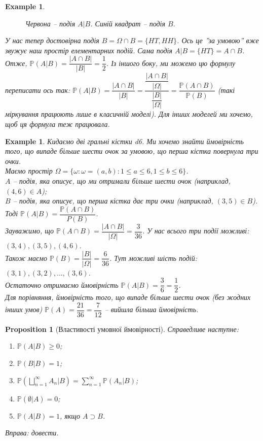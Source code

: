 \documentclass[a4paper, 10pt]{article}
\theoremstyle{theoremdd}
\newtheorem{example}[theorem]{Example}
\newtheorem{proposition}[theorem]{Proposition}
\begin{document}
\begin{example}
\begin{figure}[H]
\caption*{Червона -- подія $A|B$. Синій квадрат -- подія $B$.}
\end{figure}
\noindent
У нас тепер достовірна подія $B = \Omega \cap B = \{HT,HH\}$. Ось це ''за умовою'' вже звужує наш простір елементарних подій. Сама подія $A|B = \{HT\} = A \cap B$. Отже, $\mathbb{P}(A|B) = \dfrac{|A \cap B|}{|B|} = \dfrac{1}{2}$. Із іншого боку, ми можемо цю формулу переписати ось так: $\mathbb{P}(A|B) = \dfrac{|A \cap B|}{|B|} = \dfrac{\dfrac{|A \cap B|}{|\Omega|}}{\dfrac{|B|}{|\Omega|}} = \dfrac{\mathbb{P}(A \cap B)}{\mathbb{P}(B)}$ (такі міркування працюють лише в класичній моделі). Для інших моделей ми хочемо, щоб ця формула теж працювала.
\end{example}

\begin{example}
Кидаємо дві гральні кістки d6. Ми хочемо знайти ймовірність того, що випаде більше шести очок за умовою, що перша кістка повернула три очки.\\
Маємо простір $\Omega = \{ \omega: \omega = (a,b): 1 \leq a \leq 6, 1 \leq b \leq 6\}$.\\
$A$ -- подія, яка описує, що ми отримали більше шести очок (наприклад, $(4,6) \in A$);\\
$B$ -- подія, яка описує, що перша кістка дає три очки (наприклад, $(3,5) \in B$).\\
Тоді $\mathbb{P}(A|B) = \dfrac{\mathbb{P}(A \cap B)}{P(B)}$.\\
Зауважимо, що $\mathbb{P}(A \cap B) = \dfrac{|A \cap B|}{|\Omega|} = \dfrac{3}{36}$. У нас всього три події можливі: $(3,4),(3,5),(4,6)$.\\
Також маємо $\mathbb{P}(B) = \dfrac{|B|}{|\Omega|} = \dfrac{6}{36}$. Тут можливі шість подій: $(3,1), (3,2), \dots, (3,6)$.\\
Остаточно отримаємо ймовірність $\mathbb{P}(A|B) = \dfrac{3}{6} = \dfrac{1}{2}$.\\
Для порівняння, ймовірність того, що випаде більше шести очок (без жодних інших умов) $\mathbb{P}(A) = \dfrac{21}{36} = \dfrac{7}{12}$ -- вийшла більша ймовірність.
\end{example}

\begin{proposition}[Властивості умовної ймовірності]
Справедливе наступне:
\begin{enumerate}[nosep,wide=0pt,label={\arabic*)}]
\item $\mathbb{P}(A|B) \geq 0$;
\item $\mathbb{P}(B|B) = 1$;
\item $\displaystyle \mathbb{P}\left(\bigsqcup_{n=1}^\infty A_n | B\right) = \sum_{n=1}^\infty \mathbb{P}(A_n | B)$;
\item $\mathbb{P}(\emptyset|A) = 0$;
\item $\mathbb{P}(A|B) = 1$, якщо $A \supset B$.
\end{enumerate}
\textit{Вправа: довести.}
\end{proposition}
\end{document}
